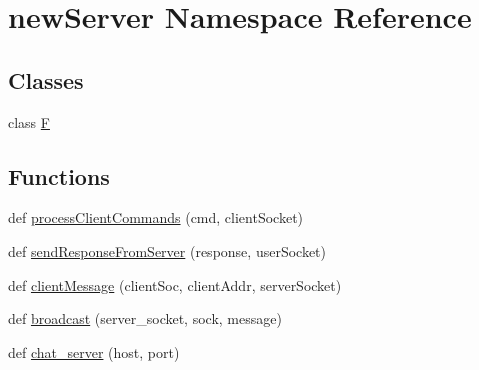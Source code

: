 \hypertarget{namespacenew_server}{}\section{new\+Server Namespace Reference}
\label{namespacenew_server}
\subsection*{Classes}
\begin{DoxyCompactItemize}
\item 
class \hyperlink{classnew_server_1_1_f}{F}
\end{DoxyCompactItemize}
\subsection*{Functions}
\begin{DoxyCompactItemize}
\item 
def \hyperlink{namespacenew_server_ae9d433fa51d0c682b18c3b9879cb0a1f}{process\+Client\+Commands} (cmd, client\+Socket)
\item 
def \hyperlink{namespacenew_server_a35090b3a9dc30b6f28f73efc7e104cc9}{send\+Response\+From\+Server} (response, user\+Socket)
\item 
def \hyperlink{namespacenew_server_af9cb120a81a10188d82dd3aaec0eea2d}{client\+Message} (client\+Soc, client\+Addr, server\+Socket)
\item 
def \hyperlink{namespacenew_server_a32d38e8c1989792b3d964150ed181779}{broadcast} (server\+\_\+socket, sock, message)
\item 
def \hyperlink{namespacenew_server_abe65059086c03efc53e029abe9cc98fc}{chat\+\_\+server} (host, port)
\end{DoxyCompactItemize}
